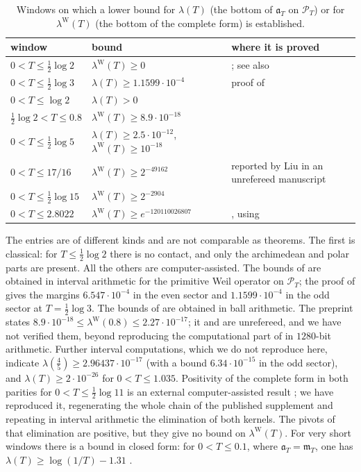 \documentclass[11pt]{amsart}
\theoremstyle{definition}
\theoremstyle{remark}
\numberwithin{equation}{section}
\newcommand{\PT}{\mathcal{P}_T}                        %
\newcommand{\mT}{\mathfrak{m}_T}                       %
\newcommand{\aT}{\mathfrak{a}_T}                       %
\newcommand{\lam}{\lambda(T)}                          %
\newcommand{\lamW}{\lambda^{\mathrm W}(T)}             %
\begin{document}
\begin{table}[htbp]
\centering\small
\renewcommand{\arraystretch}{1.15}
\begin{tabular}{p{3.0cm}p{5.2cm}p{5.2cm}}
\toprule
window & bound & where it is proved\\
\midrule
$0<T\le\frac12\log2$ & $\lamW\ge0$ & \cite[Theorem~1]{Yoshida1992}; see also \cite{Bombieri2000}\\
$0<T\le\frac12\log3$ & $\lam\ge1.1599\cdot10^{-4}$ & proof of \cite[Theorem~9.18]{P42}\\
$0<T\le\log2$ & $\lam>0$ & \cite[Theorem~9.18, Corollary~9.20]{P42}\\
$\frac12\log2<T\le0.8$ & $\lamW\ge8.9\cdot10^{-18}$ & \cite{Zhu2026}\\
$0<T\le\frac12\log5$ & $\lam\ge2.5\cdot10^{-12}$, $\lamW\ge10^{-18}$ & \cite[Theorem~9.1]{P46}\\
$0<T\le17/16$ & $\lamW\ge2^{-49162}$ & reported by Liu in an unrefereed manuscript \cite{Liu2026}\\
$0<T\le\frac12\log15$ & $\lamW\ge2^{-2904}$ & \cite{Mori15}\\
$0<T\le2.8022$ & $\lamW\ge e^{-120110026807}$ & \cite[\S9.3]{P46}, using \cite{PlattTrudgian2021}\\
\bottomrule
\end{tabular}
\caption{Windows on which a lower bound for $\lam$ (the bottom of $\aT$ on $\PT$) or for $\lamW$ (the bottom of the
complete form) is established.}
\label{w2:tab:certified}
\end{table}

The entries are of different kinds and are not comparable as theorems. The first is classical: for
$T\le\frac12\log2$ there is no contact, and only the archimedean and polar parts are present. All the others are
computer-assisted. The bounds of \cite{P42} are obtained in interval arithmetic for the primitive Weil operator on
$\PT$; the proof of \cite[Theorem~9.18]{P42} gives the margins $6.547\cdot10^{-4}$ in the even sector and
$1.1599\cdot10^{-4}$ in the odd sector at $T=\frac12\log3$. The bounds of \cite[Theorem~9.1]{P46} are obtained in ball
arithmetic. The preprint \cite{Zhu2026} states $8.9\cdot10^{-18}\le\lambda^{\mathrm W}(0.8)\le2.27\cdot10^{-17}$; it and
\cite{Mori15} are unrefereed, and we have not verified them, beyond reproducing the computational part of
\cite{Mori15} in $1280$-bit arithmetic. Further interval computations, which we do not reproduce here, indicate $\lambda(\frac45)\ge2.96437\cdot10^{-17}$ (with a bound $6.34\cdot10^{-15}$ in the odd sector),
and $\lam\ge2\cdot10^{-26}$ for $0<T\le1.035$. Positivity of the complete form in both parities for
$0<T\le\frac12\log11$ is an external computer-assisted result \cite{RStation45}; we have reproduced it, regenerating
the whole chain of the published supplement and repeating in interval arithmetic the elimination of both kernels. The
pivots of that elimination are positive, but they give no bound on $\lamW$. For very short windows there is a bound in closed form: for $0<T\le0.1$, where $\aT=\mT$, one has
$\lam\ge\log(1/T)-1.31$ \cite[Theorem~10.9]{P46}.
\end{document}
